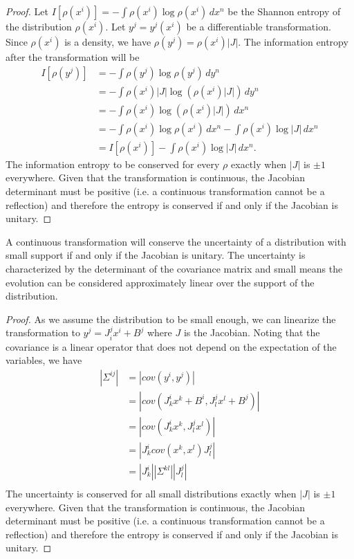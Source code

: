 \documentclass[10pt,twocolumn, nofootinbib]{revtex4-2}
\begin{document}
\begin{proof}
	Let $I[\rho(x^i)] = - \int \rho(x^i) \log \rho(x^i) \, dx^n$ be the Shannon entropy of the distribution $\rho(x^i)$. Let $y^j=y^j(x^i)$ be a differentiable transformation. Since $\rho(x^i)$ is a density, we have $\rho(y^j) = \rho(x^i) |J|$. The information entropy after the transformation will be
	\begin{align*}
		I[\rho(y^j)] &= - \int \rho(y^j) \log \rho(y^j) \, dy^n \\
		&= - \int \rho(x^i) |J| \log \left( \rho(x^i) |J| \right) \, dy^n \\
		&= - \int \rho(x^i) \log \left( \rho(x^i) |J| \right) \, dx^n \\
		&= - \int \rho(x^i) \log \rho(x^i) \, dx^n - \int \rho(x^i) \log |J| \, dx^n \\
		&= I[\rho(x^i)] - \int \rho(x^i) \log |J| \, dx^n.
	\end{align*}
	The information entropy to be conserved for every $\rho$ exactly when $|J|$ is $\pm 1$ everywhere. Given that the transformation is continuous, the Jacobian determinant must be positive (i.e. a continuous transformation cannot be a reflection) and therefore the entropy is conserved if and only if the Jacobian is unitary.
\end{proof}

\begin{prop}
	A continuous transformation will conserve the uncertainty of a distribution with small support if and only if the Jacobian is unitary. The uncertainty is characterized by the determinant of the covariance matrix and small means the evolution can be considered approximately linear over the support of the distribution.
\end{prop}

\begin{proof}
	As we assume the distribution to be small enough, we can linearize the transformation to $y^j = J^j_i x^i + B^j$ where $J$ is the Jacobian. Noting that the covariance is a linear operator that does not depend on the expectation of the variables, we have
	\begin{align*}
		|\Sigma^{ij}| &= |cov(y^i, y^j)| \\
		&= |cov(J^i_k x^k + B^i, J^j_l x^l + B^j)| \\
		&= |cov(J^i_k x^k , J^j_l x^l )| \\
		&= |J^i_k cov(x^k , x^l ) J^j_l| \\
		&= |J^i_k | | \Sigma^{kl} | | J^j_l| \\
	\end{align*}
	The uncertainty is conserved for all small distributions exactly when $|J|$ is $\pm 1$ everywhere. Given that the transformation is continuous, the Jacobian determinant must be positive (i.e. a continuous transformation cannot be a reflection) and therefore the entropy is conserved if and only if the Jacobian is unitary.
\end{proof}
\end{document}

